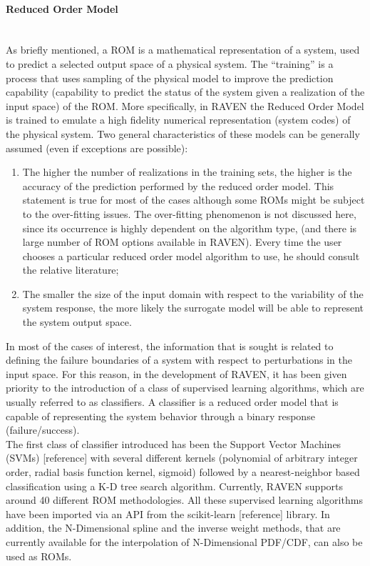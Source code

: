 \paragraph{Reduced Order Model} ~\\
 As briefly mentioned, a ROM is a mathematical representation of a system, used to predict a selected output space of a physical system.
The ``training'' is a process that uses sampling of the physical model to improve the prediction capability (capability to predict the status of the system given a realization of the input space) of the ROM. More specifically, in RAVEN the Reduced Order Model is trained to emulate a high fidelity numerical representation (system codes) of the physical system. Two general characteristics of these models can be generally assumed (even if exceptions are possible):
\begin{enumerate}
   \item The higher the number of realizations in the training sets, the higher is the accuracy of the prediction performed by the reduced order model. This statement is true for most of the cases although some ROMs might be subject to the over-fitting issues. The over-fitting phenomenon is not discussed here, since its occurrence is highly dependent on the algorithm type, (and there is large number of ROM options available in RAVEN). Every time the user chooses a particular reduced order model algorithm to use, he should consult the relative literature;
   \item The smaller the size of the input domain with respect to the variability of the system response, the more likely the surrogate model will be able to represent the system output space.
\end{enumerate}
In most of the cases of interest, the information that is sought is related to defining the failure boundaries of a system with respect to perturbations in the input space. For this reason, in the development of RAVEN, it has been given priority to the introduction of a class of supervised learning algorithms, which are usually referred to as classifiers. A classifier is a reduced order model that is capable of representing the system behavior through a binary response (failure/success).
\\The first class of classifier introduced has been the Support Vector Machines (SVMs) [reference] with several different kernels (polynomial of arbitrary integer order, radial basis function kernel, sigmoid) followed by a nearest-neighbor based classification using a K-D tree search algorithm. Currently, RAVEN supports around 40 different ROM methodologies. All these supervised learning algorithms have been imported via an API from the scikit-learn [reference] library. In addition, the N-Dimensional spline and the inverse weight methods, that are currently available for the interpolation of N-Dimensional PDF/CDF, can also be used as ROMs.
